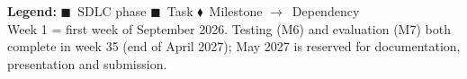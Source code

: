 \documentclass[10pt]{article}
\begin{document}
\begin{center}
\begin{ganttchart}
\end{ganttchart}
\end{center}

\vspace{0.5mm}
\begin{center}\scriptsize\color{gcInk!75}
\textbf{Legend:}\; \textcolor{gcBerry}{$\blacksquare$}~SDLC phase \quad \textcolor{gcRose}{$\blacksquare$}~Task \quad \textcolor{gcBerryDk}{$\blacklozenge$}~Milestone \quad $\rightarrow$~Dependency\\[2pt]
Week 1 = first week of September 2026. \; Testing (M6) and evaluation (M7) both complete in week 35 (end of April 2027); May 2027 is reserved for documentation, presentation and submission.
\end{center}
\end{document}
